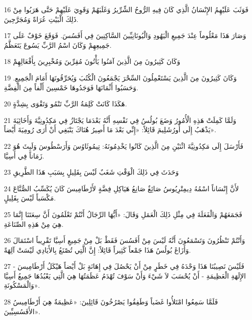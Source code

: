 \par 16 فَوَثَبَ عَلَيْهِمُ الإِنْسَانُ الَّذِي كَانَ فِيهِ الرُّوحُ الشِّرِّيرُ وَغَلَبَهُمْ وَقَوِيَ عَلَيْهِمْ حَتَّى هَرَبُوا مِنْ ذَلِكَ الْبَيْتِ عُرَاةً وَمُجَرَّحِينَ.
\par 17 وَصَارَ هَذَا مَعْلُوماً عِنْدَ جَمِيعِ الْيَهُودِ وَالْيُونَانِيِّينَ السَّاكِنِينَ فِي أَفَسُسَ. فَوَقَعَ خَوْفٌ عَلَى جَمِيعِهِمْ وَكَانَ اسْمُ الرَّبِّ يَسُوعَ يَتَعَظَّمُ.
\par 18 وَكَانَ كَثِيرُونَ مِنَ الَّذِينَ آمَنُوا يَأْتُونَ مُقِرِّينَ وَمُخْبِرِينَ بِأَفْعَالِهِمْ
\par 19 وَكَانَ كَثِيرُونَ مِنَ الَّذِينَ يَسْتَعْمِلُونَ السِّحْرَ يَجْمَعُونَ الْكُتُبَ وَيُحَرِّقُونَهَا أَمَامَ الْجَمِيعِ. وَحَسَبُوا أَثْمَانَهَا فَوَجَدُوهَا خَمْسِينَ أَلْفاً مِنَ الْفِضَّةِ.
\par 20 هَكَذَا كَانَتْ كَلِمَةُ الرَّبِّ تَنْمُو وَتَقْوَى بِشِدَّةٍ.
\par 21 وَلَمَّا كَمِلَتْ هَذِهِ الْأُمُورُ وَضَعَ بُولُسُ فِي نَفْسِهِ أَنَّهُ بَعْدَمَا يَجْتَازُ فِي مَكِدُونِيَّةَ وَأَخَائِيَةَ يَذْهَبُ إِلَى أُورُشَلِيمَ قَائِلاً: «إِنِّي بَعْدَ مَا أَصِيرُ هُنَاكَ يَنْبَغِي أَنْ أَرَى رُومِيَةَ أَيْضاً».
\par 22 فَأَرْسَلَ إِلَى مَكِدُونِيَّةَ اثْنَيْنِ مِنَ الَّذِينَ كَانُوا يَخْدِمُونَهُ: تِيمُوثَاوُسَ وَأَرَسْطُوسَ وَلَبِثَ هُوَ زَمَاناً فِي أَسِيَّا.
\par 23 وَحَدَثَ فِي ذَلِكَ الْوَقْتِ شَغَبٌ لَيْسَ بِقَلِيلٍ بِسَبَبِ هَذَا الطَّرِيقِ
\par 24 لأَنَّ إِنْسَاناً اسْمُهُ دِيمِتْرِيُوسُ صَائِغٌ صَانِعُ هَيَاكِلِ فِضَّةٍ لأَرْطَامِيسَ كَانَ يُكَسِّبُ الصُّنَّاعَ مَكْسَباً لَيْسَ بِقَلِيلٍ.
\par 25 فَجَمَعَهُمْ وَالْفَعَلَةَ فِي مِثْلِ ذَلِكَ الْعَمَلِ وَقَالَ: «أَيُّهَا الرِّجَالُ أَنْتُمْ تَعْلَمُونَ أَنَّ سِعَتَنَا إِنَّمَا هِيَ مِنْ هَذِهِ الصِّنَاعَةِ.
\par 26 وَأَنْتُمْ تَنْظُرُونَ وَتَسْمَعُونَ أَنَّهُ لَيْسَ مِنْ أَفَسُسَ فَقَطْ بَلْ مِنْ جَمِيعِ أَسِيَّا تَقْرِيباً اسْتَمَالَ وَأَزَاغَ بُولُسُ هَذَا جَمْعاً كَثِيراً قَائِلاً: إِنَّ الَّتِي تُصْنَعُ بِالأَيَادِي لَيْسَتْ آلِهَةً.
\par 27 فَلَيْسَ نَصِيبُنَا هَذَا وَحْدَهُ فِي خَطَرٍ مِنْ أَنْ يَحْصُلَ فِي إِهَانَةٍ بَلْ أَيْضاً هَيْكَلُ أَرْطَامِيسَ - الإِلَهَةِ الْعَظِيمَةِ - أَنْ يُحْسَبَ لاَ شَيْءَ وَأَنْ سَوْفَ تُهْدَمُ عَظَمَتُهَا هِيَ الَّتِي يَعْبُدُهَا جَمِيعُ أَسِيَّا وَالْمَسْكُونَةِ».
\par 28 فَلَمَّا سَمِعُوا امْتَلأُوا غَضَباً وَطَفِقُوا يَصْرُخُونَ قَائِلِينَ: «عَظِيمَةٌ هِيَ أَرْطَامِيسُ الأَفَسُسِيِّينَ».
